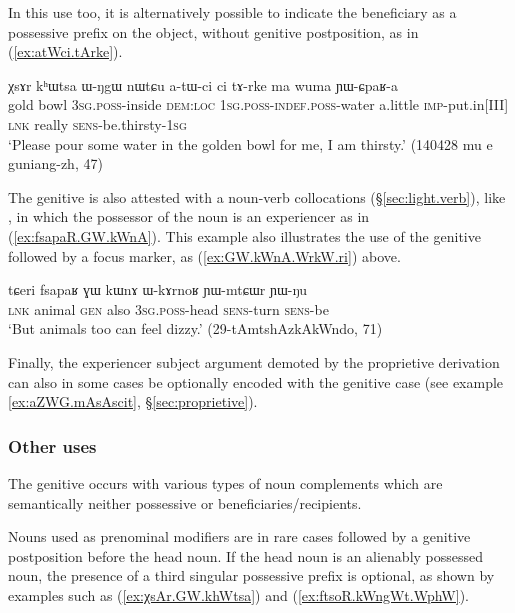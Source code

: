 In this use too, it is alternatively possible to indicate the beneficiary as a possessive prefix on the object, without genitive postposition, as in (\ref{ex:atWci.tArke}).

 \begin{exe}
\ex \label{ex:atWci.tArke}
\gll   χsɤr kʰɯtsa ɯ-ŋgɯ nɯtɕu a-tɯ-ci ci tɤ-rke ma wuma ɲɯ-ɕpaʁ-a \\
gold bowl \textsc{3sg}.\textsc{poss}-inside \textsc{dem}:\textsc{loc} \textsc{1sg}.\textsc{poss}-\textsc{indef}.\textsc{poss}-water a.little \textsc{imp}-put.in[III] \textsc{lnk} really \textsc{sens}-be.thirsty-\textsc{1sg} \\
\glt  `Please pour some water in the golden bowl for me, I am thirsty.' (140428 mu e guniang-zh, 47)
\end{exe}

The genitive is also attested with a noun-verb collocations (§\ref{sec:light.verb}), like , in which the possessor  of the noun is an experiencer as in (\ref{ex:fsapaR.GW.kWnA}). This example also illustrates the use of the genitive followed by a focus marker, as (\ref{ex:GW.kWnA.WrkW.ri}) above.

\begin{exe}
\ex \label{ex:fsapaR.GW.kWnA}
\gll tɕeri fsapaʁ ɣɯ kɯnɤ ɯ-kɤrnoʁ ɲɯ-mtɕɯr ɲɯ-ŋu \\
\textsc{lnk} animal \textsc{gen} also \textsc{3sg}.\textsc{poss}-head \textsc{sens}-turn \textsc{sens}-be \\
\glt `But animals too can feel dizzy.' (29-tAmtshAzkAkWndo, 71)
\end{exe}

Finally, the experiencer subject argument demoted by the proprietive derivation can also in some cases be optionally encoded with the genitive case (see example \ref{ex:aZWG.mAsAscit}, §\ref{sec:proprietive}).

\subsubsection{Other uses} \label{sec:gen.other}
The genitive  occurs with various types of noun complements which are semantically neither possessive or beneficiaries/recipients. 

Nouns used as prenominal modifiers are in rare cases followed by a genitive postposition before the head noun. If the head noun is an alienably possessed noun, the presence of a third singular possessive prefix  is optional, as shown by examples such as (\ref{ex:χsAr.GW.khWtsa}) and (\ref{ex:ftsoR.kWngWt.WphW}). 

